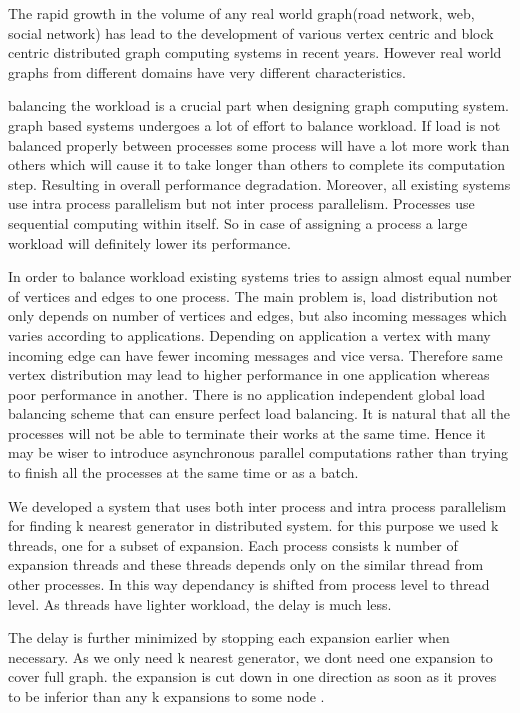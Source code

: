 \documentclass{sig-alternate}
\begin{document}
The rapid growth in the volume of any real world graph(road network, web, social network) has lead to the development of various vertex centric and block centric distributed graph computing systems in recent years. However real world graphs from different domains have very different characteristics.  

balancing the workload is a crucial part when designing graph computing system. graph based systems undergoes a lot of effort to balance workload. If load is not balanced properly between processes some process will have a lot more work than others which will cause it to take longer than others to complete its computation step. Resulting in overall performance degradation. Moreover, all existing systems use intra process parallelism but not inter process parallelism. Processes use sequential computing within itself. So in case of assigning a process a large workload will definitely lower its performance.

 In order to balance workload existing systems tries to assign almost equal number of vertices and edges to one process. The main problem is, load distribution not only depends on number of vertices and edges, but also incoming messages which varies according to applications. Depending on application a vertex with many incoming edge can have fewer incoming messages and vice versa. Therefore same vertex distribution may lead to higher performance in one application whereas poor performance in another. There is no application independent global load balancing scheme that can ensure perfect load balancing. It is natural that all the processes will not be able to terminate their works at the same time. Hence it may be wiser to introduce asynchronous parallel computations rather than trying to finish all the processes at the same time or as a batch.  

We developed a system that uses both inter process and intra process parallelism for finding k nearest generator in distributed system. for this purpose we used k threads, one for a subset of expansion. Each process consists k number of expansion threads and these threads depends only on the similar thread from other processes. In this way dependancy is shifted from process level to thread level. As threads have lighter workload, the delay is much less.

The delay is further minimized by stopping each expansion earlier when necessary. As we only need k nearest generator, we dont need one expansion to cover full graph. the expansion is cut down in one direction as soon as it proves to be inferior than any k expansions to some node  .
   
\end{document}
